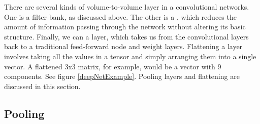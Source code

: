 There are several kinds of volume-to-volume layer in a convolutional networks. One is a filter bank, as discussed above. The other is a , which reduces the amount of information passing through the network without altering its basic structure. Finally, we can  a layer, which takes us from the convolutional layers back to a traditional feed-forward  node and weight layers. Flattening a layer involves taking all the values in a tensor and simply arranging them into a single vector. A flattened 3x3 matrix, for example, would be a vector with 9 components. See figure \ref{deepNetExample}. Pooling layers and flattening are discussed in this section.



\subsection{Pooling}


